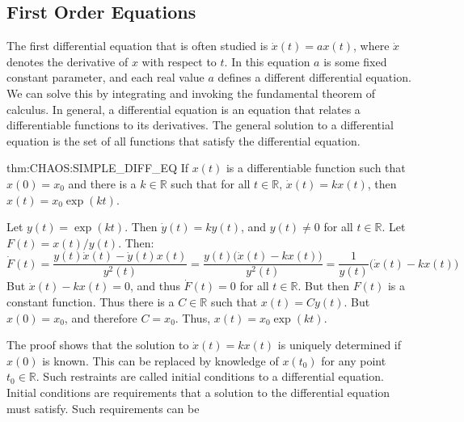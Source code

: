 \documentclass[crop=false,class=book,oneside]{standalone}
\begin{document}
        \subsection{First Order Equations}
        The first differential equation that is often studied
        is $\dot{x}(t)=ax(t)$, where $\dot{x}$ denotes the
        derivative of $x$ with respect to $t$. In this equation
        $a$ is some fixed constant parameter, and each real
        value $a$ defines a different differential equation.
        We can solve this by integrating and invoking the
        fundamental theorem of calculus. In general, a
        differential equation is an equation that relates
        a differentiable functions to its derivatives.
        The general solution to a differential equation is
        the set of all functions that satisfy the
        differential equation.
        \begin{frametheorem}{}{thm:CHAOS:SIMPLE_DIFF_EQ}
            If $x(t)$ is a differentiable function such
            that $x(0)=x_{0}$ and there is a $k\in\mathbb{R}$
            such that for all $t\in\mathbb{R}$, $\dot{x}(t)=kx(t)$,
            then $x(t)=x_{0}\exp(kt)$.
        \end{frametheorem}
        \begin{bproof}
            Let $y(t)=\exp(kt)$. Then $\dot{y}(t)=ky(t)$,
            and $y(t)\ne{0}$ for all $t\in\mathbb{R}$.
            Let $F(t)=x(t)/y(t)$. Then:
            \begin{equation*}
                \dot{F}(t)=
                \frac{y(t)\dot{x}(t)-\dot{y}(t)x(t)}{y^{2}(t)}
                =\frac{y(t)\big(\dot{x}(t)-kx(t)\big)}{y^{2}(t)}
                =\frac{1}{y(t)}\big(\dot{x}(t)-kx(t)\big)
            \end{equation*}
            But $\dot{x}(t)-kx(t)=0$, and thus $\dot{F}(t)=0$ for
            all $t\in\mathbb{R}$. But then $F(t)$ is a constant
            function. Thus there is a $C\in\mathbb{R}$ such
            that $x(t)=Cy(t)$. But $x(0)=x_{0}$, and therefore
            $C=x_{0}$. Thus, $x(t)=x_{0}\exp(kt)$.
        \end{bproof}
        The proof shows that the solution to $\dot{x}(t)=kx(t)$
        is uniquely determined if $x(0)$ is known. This can
        be replaced by knowledge of $x(t_{0})$ for any point
        $t_{0}\in\mathbb{R}$.
        Such restraints are called initial conditions to a
        differential equation. Initial conditions are
        requirements that a solution to the differential
        equation must satisfy. Such requirements can be
\end{document}
